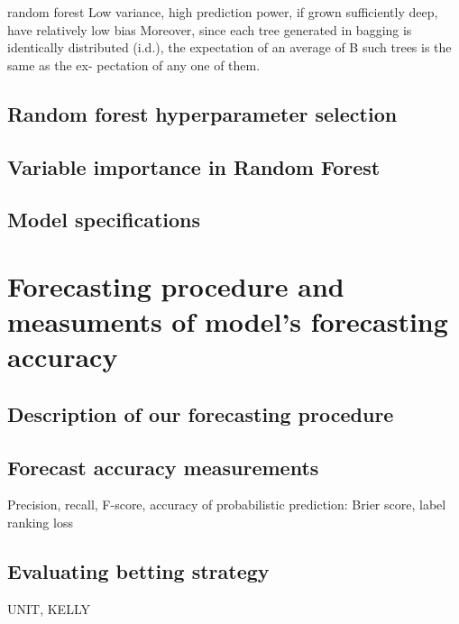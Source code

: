 random forest
Low variance, high prediction power, if grown sufficiently deep, have relatively low bias
Moreover, since each tree generated in bagging is identically distributed (i.d.), the expectation of an average of B such trees is the same as the ex- pectation of any one of them.
\subsection{Random forest hyperparameter selection}
\subsection{Variable importance in Random Forest}
\subsection{Model specifications}
\section{Forecasting procedure and measuments of model's forecasting accuracy}
\subsection{Description of our forecasting procedure}
\subsection{Forecast accuracy measurements}
Precision, recall, F-score, accuracy of probabilistic prediction: Brier score, label ranking loss
\subsection{Evaluating betting strategy}
UNIT, KELLY




